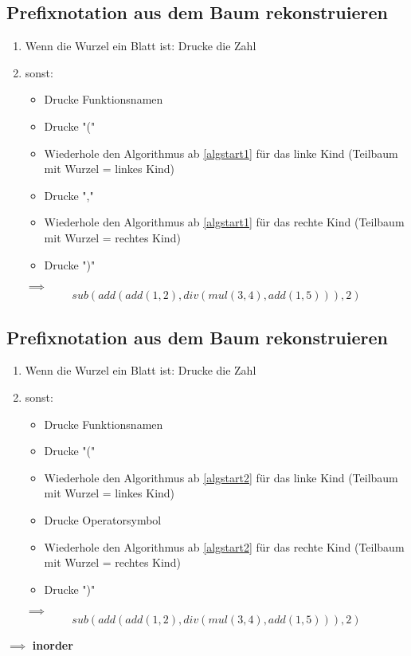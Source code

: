 \documentclass[a4paper]{scrartcl}
\begin{document}
\subsection{Prefixnotation aus dem Baum rekonstruieren}
\label{sec-4-4}
\begin{enumerate}
\item \label{algstart1} Wenn die Wurzel ein Blatt ist: Drucke die Zahl
\item sonst:
\begin{itemize}
\item Drucke Funktionsnamen
\item Drucke "("
\item Wiederhole den Algorithmus ab \ref{algstart1} für das linke Kind (Teilbaum mit Wurzel = linkes Kind)
\item Drucke ","
\item Wiederhole den Algorithmus ab \ref{algstart1} für das rechte Kind (Teilbaum mit Wurzel = rechtes Kind)
\item Drucke ")"
\end{itemize}
$\implies$ \[sub(add(add(1,2),div(mul(3,4),add(1,5))), 2)\]
\end{enumerate}
\subsection{Prefixnotation aus dem Baum rekonstruieren}
\label{sec-4-5}
\begin{enumerate}
\item \label{algstart2} Wenn die Wurzel ein Blatt ist: Drucke die Zahl
\item sonst:
\begin{itemize}
\item Drucke Funktionsnamen
\item Drucke "("
\item Wiederhole den Algorithmus ab \ref{algstart2} für das linke Kind (Teilbaum mit Wurzel = linkes Kind)
\item Drucke Operatorsymbol
\item Wiederhole den Algorithmus ab \ref{algstart2} für das rechte Kind (Teilbaum mit Wurzel = rechtes Kind)
\item Drucke ")"
\end{itemize}
$\implies$ \[sub(add(add(1,2),div(mul(3,4),add(1,5))), 2)\]
\end{enumerate}
$\implies$ \textbf{inorder}
\end{document}
